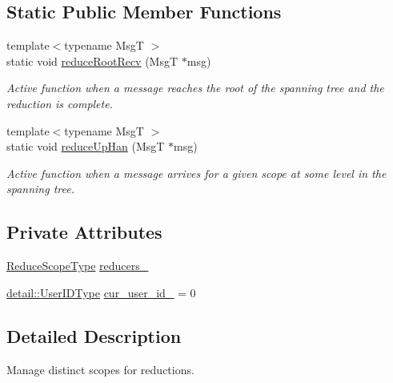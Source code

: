 \subsection*{Static Public Member Functions}
\begin{DoxyCompactItemize}
\item 
{\footnotesize template$<$typename MsgT $>$ }\\static void \hyperlink{structvt_1_1collective_1_1reduce_1_1_reduce_manager_a7ee21e635c585acc7d7339911a0900eb}{reduce\+Root\+Recv} (MsgT $\ast$msg)
\begin{DoxyCompactList}\small\item\em Active function when a message reaches the root of the spanning tree and the reduction is complete. \end{DoxyCompactList}\item 
{\footnotesize template$<$typename MsgT $>$ }\\static void \hyperlink{structvt_1_1collective_1_1reduce_1_1_reduce_manager_a257d3445e311d1347a7e2f20a487d556}{reduce\+Up\+Han} (MsgT $\ast$msg)
\begin{DoxyCompactList}\small\item\em Active function when a message arrives for a given scope at some level in the spanning tree. \end{DoxyCompactList}\end{DoxyCompactItemize}
\subsection*{Private Attributes}
\begin{DoxyCompactItemize}
\item 
\hyperlink{structvt_1_1collective_1_1reduce_1_1_reduce_manager_a2c340e5d3b12e4f2df64b9c1502445cf}{Reduce\+Scope\+Type} \hyperlink{structvt_1_1collective_1_1reduce_1_1_reduce_manager_a8226dde1ab69b8332db65f558f405ad5}{reducers\+\_\+}
\item 
\hyperlink{namespacevt_1_1collective_1_1reduce_1_1detail_ae82d7b96b0885b9b7dfb0104398beead}{detail\+::\+User\+I\+D\+Type} \hyperlink{structvt_1_1collective_1_1reduce_1_1_reduce_manager_a716c66493c02898d5ac8c2b8ca62efd0}{cur\+\_\+user\+\_\+id\+\_\+} = 0
\end{DoxyCompactItemize}


\subsection{Detailed Description}
Manage distinct scopes for reductions. 

